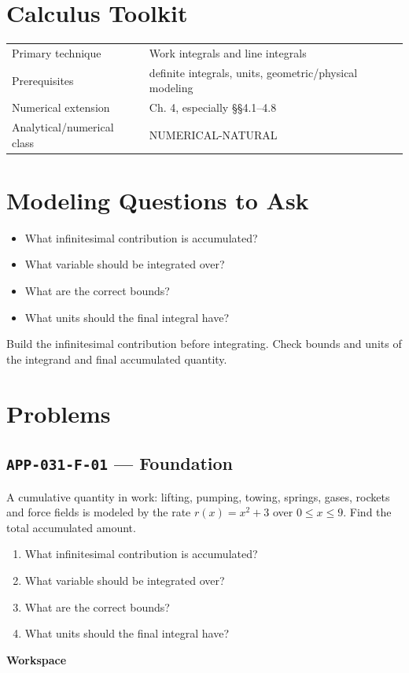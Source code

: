 \documentclass[11pt]{book}
\newcommand{\pid}[1]{\texttt{#1}}
\newcommand{\workspace}{\par\vspace{0.7in}\hrulefill\par\vspace{0.55in}\hrulefill\par}
\begin{document}
\section*{Calculus Toolkit}
\begin{tabularx}{\textwidth}{@{}lX@{}}\toprule
Primary technique & Work integrals and line integrals \\
Prerequisites & definite integrals, units, geometric/physical modeling \\
Numerical extension & Ch. 4, especially §§4.1–4.8 \\
Analytical/numerical class & NUMERICAL-NATURAL \\
\bottomrule\end{tabularx}
\section*{Modeling Questions to Ask}\begin{itemize}
\item What infinitesimal contribution is accumulated?
\item What variable should be integrated over?
\item What are the correct bounds?
\item What units should the final integral have?
\end{itemize}
\begin{errorbox}Build the infinitesimal contribution before integrating. Check bounds and units of the integrand and final accumulated quantity.\end{errorbox}
\section*{Problems}
\subsection*{\pid{APP-031-F-01} — Foundation}
\begin{problembox}
A cumulative quantity in work: lifting, pumping, towing, springs, gases, rockets and force fields is modeled by the rate $r(x)=x^2+3$ over $0\le x\le 9$. Find the total accumulated amount.
\end{problembox}
\begin{promptbox}\begin{enumerate}
\item What infinitesimal contribution is accumulated?
\item What variable should be integrated over?
\item What are the correct bounds?
\item What units should the final integral have?
\end{enumerate}\end{promptbox}
\textbf{Workspace}\workspace
{}
\end{document}
